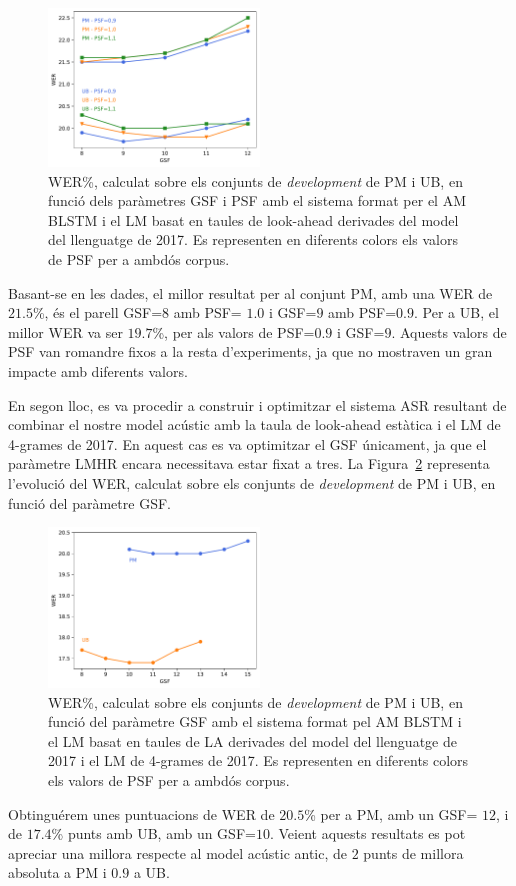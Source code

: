 \begin{figure}[ht!]
    \centering
    \includegraphics[width=0.5\textwidth]{figuras/gsf_oldlm_small.pdf}
    \caption{WER\%, calculat sobre els conjunts de \textit{development} de PM i UB, en funció dels paràmetres GSF i PSF amb el sistema format per el AM BLSTM i el LM basat en taules de look-ahead derivades del model del llenguatge de 2017. Es representen en diferents colors els valors de PSF per a ambdós corpus.}
    \label{fig:gsf_oldlm_small}
\end{figure}
Basant-se en les dades, el millor resultat per al conjunt PM, amb una WER de $21.5$\%, és el parell GSF=$8$ amb PSF= $1.0$ i GSF=$9$ amb PSF=$0.9$. Per a UB, el millor WER va ser $19.7$\%, per als valors de PSF=$0.9$ i GSF=$9$. Aquests valors de PSF van romandre fixos a la resta d'experiments, ja que no mostraven un gran impacte amb diferents valors.

En segon lloc, es va procedir a construir i optimitzar el sistema ASR resultant de combinar el nostre model acústic amb la taula de look-ahead estàtica i el LM de 4-grames de 2017.
En aquest cas es va optimitzar el GSF únicament, ja que el paràmetre LMHR encara necessitava estar fixat a tres.
La Figura~\ref{fig:gsf_oldlm_big} representa l'evolució del WER, calculat sobre els conjunts de \textit{development} de PM i UB, en funció del paràmetre GSF.

\begin{figure}[ht!]
    \centering
    \includegraphics[width=0.5\textwidth]{figuras/gsf_oldlm_big.pdf}
    \caption{WER\%, calculat sobre els conjunts de \textit{development} de PM i UB, en funció del paràmetre GSF amb el sistema format pel AM BLSTM i el LM basat en taules de LA derivades del model del llenguatge de 2017 i el LM de 4-grames de 2017. Es representen en diferents colors els valors de PSF per a ambdós corpus.}
    \label{fig:gsf_oldlm_big}
\end{figure}
Obtinguérem unes puntuacions de WER de $20.5$\% per a PM, amb un GSF= $12$, i de $17.4$\% punts amb UB, amb un GSF=$10$. Veient aquests resultats es pot apreciar una millora respecte al model acústic antic, de $2$ punts de millora absoluta a PM i $0.9$ a UB.

